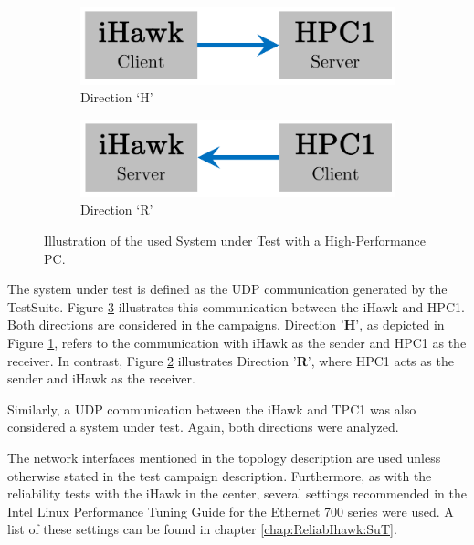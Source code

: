 \begin{figure}[h]
    \centering
    \begin{subfigure}[b]{0.45\textwidth}
        \centering
        \includegraphics[width=\textwidth]{figures/performance/sut_1a.pdf}
        \caption{Direction `H'}
        \label{fig:SutHpcPerf:H}
    \end{subfigure}
    \hfill
    \begin{subfigure}[b]{0.45\textwidth}
        \centering
        \includegraphics[width=\textwidth]{figures/performance/sut_1b.pdf}
        \caption{Direction `R'}
        \label{fig:SutHpcPerf:R}
    \end{subfigure}
    \caption{Illustration of the used System under Test with a High-Performance PC.}
    \label{fig:SutHpcPerf}
\end{figure}

The system under test is defined as the UDP communication generated by the TestSuite. Figure  \ref{fig:SutHpcPerf} illustrates this communication between the iHawk and HPC1. Both directions are considered in the campaigns. Direction '\textbf{H}', as depicted in Figure \ref{fig:SutHpcPerf:H}, refers to the communication with iHawk as the sender and HPC1 as the receiver. In contrast, Figure \ref{fig:SutHpcPerf:R} illustrates Direction '\textbf{R}', where HPC1 acts as the sender and iHawk as the receiver.

Similarly, a UDP communication between the iHawk and TPC1 was also considered a system under test. Again, both directions were analyzed.

The network interfaces mentioned in the topology description are used unless otherwise stated in the test campaign description. Furthermore, as with the reliability tests with the iHawk in the center, several settings recommended in the Intel Linux Performance Tuning Guide for the Ethernet 700 series were used. A list of these settings can be found in chapter \ref{chap:ReliabIhawk:SuT}.

